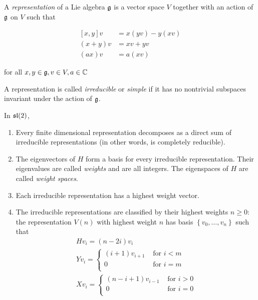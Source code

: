A \emph{representation} of a Lie algebra $\mathfrak{g}$ is a vector space $V$
together with an action of $\mathfrak{g}$ on $V$ such that 

\begin{align*}
    \left[ x,y \right] v &= x(yv) - y(xv) \\
    (x+y)v &= xv + yv \\
    (ax)v &= a(xv)
\end{align*}

for all $x,y \in \mathfrak{g}, v \in V, a \in \mathbb{C}$

A representation is called \emph{irreducible} or \emph{simple} if it has no
nontrivial subspaces invariant under the action of $\mathfrak{g}$.

In $\mathfrak{sl}(2)$,
\begin{enumerate}
    \item Every finite dimensional representation decomposes as a direct sum of
          irreducible representations (in other words, is completely reducible).
    \item The eigenvectors of $H$ form a basis for every irreducible
          representation. Their eigenvalues are called \emph{weights} and are
          all integers. The eigenspaces of $H$ are called \emph{weight spaces}.  
    \item Each irreducible representation has a highest weight vector.
    \item The irreducible representations are classified by their highest
          weights $n \geq 0$: the representation $V(n)$ with highest weight $n$
          has basis $\left\{ v_0, \ldots, v_n \right\}$ such that 
\begin{align*}
    &H v_i = (n - 2i) v_i& \\
    &Y v_i = \begin{cases} 
                (i+1)v_{i+1}& \text{ for $i < m$} \\
                0& \text{ for $i = m$} \\
            \end{cases} \\
    &X v_i = \begin{cases} 
                (n-i+1)v_{i-1}& \text{ for $i > 0$} \\
                0& \text{ for $i = 0$} \\
            \end{cases}
\end{align*}
\end{enumerate}




